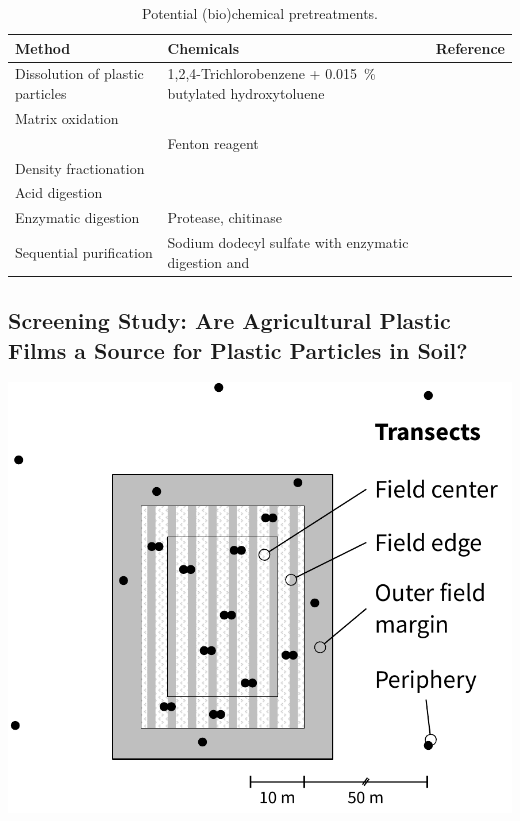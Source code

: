 \documentclass[justified,a4paper,
	nofonts,
	nobib
]{tufte-handout}
\begin{document}
\begin{table}
	\centering\footnotesize
	\caption{Potential (bio)chemical pretreatments.}\label{tab:extraction}
	\begin{tabulary}{\linewidth}{LLL}
		\toprule
		Method & Chemicals & Reference \\
		\midrule
		Dissolution of plastic particles & 1,2,4-Trichlorobenzene + \SI{0.015}{\percent} butylated hydroxytoluene & \citealp{BivensPolymertoSolvent2016} \\
		Matrix oxidation &  & \citealp{NuelleNew2014} \\
		& Fenton reagent & \\
		Density fractionation &  & \citealp{ImhofPigments2016} \\
		Acid digestion &  & \citealp{ScheurerMicroplastics2018} \\
		Enzymatic digestion & Protease, chitinase & \citealp{LoderEnzymatic2017} \\
		Sequential purification & Sodium dodecyl sulfate with enzymatic digestion and  & \citealp{FischerSimultaneous2017} \\
		\bottomrule
	\end{tabulary}
\end{table}

\subsection{Screening Study: Are Agricultural Plastic Films a Source for Plastic Particles in Soil?}

\begin{marginfigure}
	\includegraphics{proposal/field}
	\caption{Randomized sampling scheme for one exemplary plot with $n$ = 5 samples (\SIrange{0}{5}{\centi\meter} depth) per transect; within the cultivated field, ridges and furrows are sampled separately.}
	\label{fig:field}%
\end{marginfigure}
\end{document}
